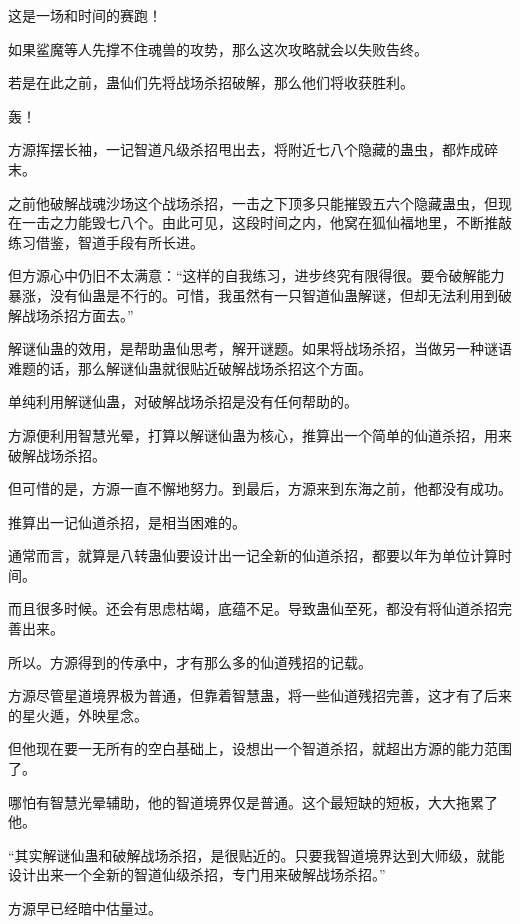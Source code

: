 
\begin{this_body}



这是一场和时间的赛跑！

如果鲨魔等人先撑不住魂兽的攻势，那么这次攻略就会以失败告终。

若是在此之前，蛊仙们先将战场杀招破解，那么他们将收获胜利。

轰！

方源挥摆长袖，一记智道凡级杀招甩出去，将附近七八个隐藏的蛊虫，都炸成碎末。

之前他破解战魂沙场这个战场杀招，一击之下顶多只能摧毁五六个隐藏蛊虫，但现在一击之力能毁七八个。由此可见，这段时间之内，他窝在狐仙福地里，不断推敲练习借鉴，智道手段有所长进。

但方源心中仍旧不太满意：“这样的自我练习，进步终究有限得很。要令破解能力暴涨，没有仙蛊是不行的。可惜，我虽然有一只智道仙蛊解谜，但却无法利用到破解战场杀招方面去。”

解谜仙蛊的效用，是帮助蛊仙思考，解开谜题。如果将战场杀招，当做另一种谜语难题的话，那么解谜仙蛊就很贴近破解战场杀招这个方面。

单纯利用解谜仙蛊，对破解战场杀招是没有任何帮助的。

方源便利用智慧光晕，打算以解谜仙蛊为核心，推算出一个简单的仙道杀招，用来破解战场杀招。

但可惜的是，方源一直不懈地努力。到最后，方源来到东海之前，他都没有成功。

推算出一记仙道杀招，是相当困难的。

通常而言，就算是八转蛊仙要设计出一记全新的仙道杀招，都要以年为单位计算时间。

而且很多时候。还会有思虑枯竭，底蕴不足。导致蛊仙至死，都没有将仙道杀招完善出来。

所以。方源得到的传承中，才有那么多的仙道残招的记载。

方源尽管星道境界极为普通，但靠着智慧蛊，将一些仙道残招完善，这才有了后来的星火遁，外映星念。

但他现在要一无所有的空白基础上，设想出一个智道杀招，就超出方源的能力范围了。

哪怕有智慧光晕辅助，他的智道境界仅是普通。这个最短缺的短板，大大拖累了他。

“其实解谜仙蛊和破解战场杀招，是很贴近的。只要我智道境界达到大师级，就能设计出来一个全新的智道仙级杀招，专门用来破解战场杀招。”

方源早已经暗中估量过。


\end{this_body}
